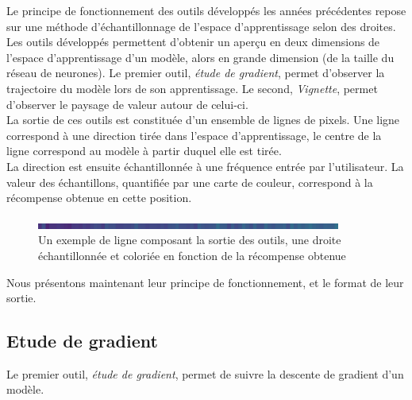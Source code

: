 \documentclass[12pt]{article}
\begin{document}
Le principe de fonctionnement des outils développés les années précédentes repose sur une méthode d’échantillonnage de l’espace d’apprentissage selon des droites. \\

Les outils développés permettent d'obtenir un aperçu en deux dimensions de l'espace d'apprentissage d'un modèle, alors en grande dimension (de la taille du réseau de neurones). Le premier outil, \emph{étude de gradient}, permet d'observer la trajectoire du modèle lors de son apprentissage. Le second, \emph{Vignette}, permet d'observer le paysage de valeur autour de celui-ci. \\

La sortie de ces outils est constituée d’un ensemble de lignes de pixels. Une ligne correspond à une direction tirée dans l’espace d’apprentissage, le centre de la ligne correspond au modèle à partir duquel elle est tirée. \\

La direction est ensuite échantillonnée à une fréquence entrée par l’utilisateur. La valeur des échantillons, quantifiée par une carte de couleur, correspond à la récompense obtenue en cette position. \\

\begin{figure}[htp]
    \centering
    \includegraphics[width=10cm]{Images/Ligne}
    \caption{Un exemple de ligne composant la sortie des outils, une droite échantillonnée et coloriée en fonction de la récompense obtenue}
    \label{fig:ligne1}
\end{figure}

Nous présentons maintenant leur principe de fonctionnement, et le format de leur sortie. \\

\subsection{Etude de gradient}

Le premier outil, \emph{étude de gradient}, permet de suivre la descente de gradient d’un modèle. \\
\end{document}
